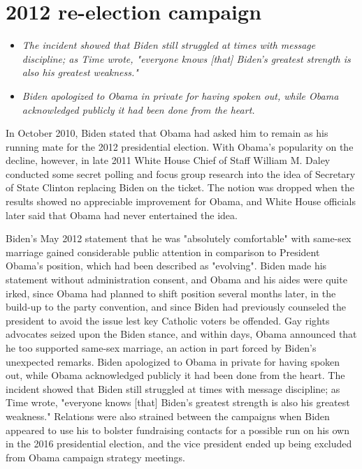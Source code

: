\section{2012 re-election campaign}\label{re-election-campaign}

\begin{itemize}
\item
  \emph{The incident showed that Biden still struggled at times with
  message discipline; as Time wrote, "everyone knows {[}that{]} Biden's
  greatest strength is also his greatest weakness."}
\item
  \emph{Biden apologized to Obama in private for having spoken out,
  while Obama acknowledged publicly it had been done from the heart.}
\end{itemize}

In October 2010, Biden stated that Obama had asked him to remain as his
running mate for the 2012 presidential election. With Obama's popularity
on the decline, however, in late 2011 White House Chief of Staff William
M. Daley conducted some secret polling and focus group research into the
idea of Secretary of State Clinton replacing Biden on the ticket. The
notion was dropped when the results showed no appreciable improvement
for Obama, and White House officials later said that Obama had never
entertained the idea.

Biden's May 2012 statement that he was "absolutely comfortable" with
same-sex marriage gained considerable public attention in comparison to
President Obama's position, which had been described as "evolving".
Biden made his statement without administration consent, and Obama and
his aides were quite irked, since Obama had planned to shift position
several months later, in the build-up to the party convention, and since
Biden had previously counseled the president to avoid the issue lest key
Catholic voters be offended. Gay rights advocates seized upon the Biden
stance, and within days, Obama announced that he too supported same-sex
marriage, an action in part forced by Biden's unexpected remarks. Biden
apologized to Obama in private for having spoken out, while Obama
acknowledged publicly it had been done from the heart. The incident
showed that Biden still struggled at times with message discipline; as
Time wrote, "everyone knows {[}that{]} Biden's greatest strength is also
his greatest weakness." Relations were also strained between the
campaigns when Biden appeared to use his to bolster fundraising contacts
for a possible run on his own in the 2016 presidential election, and the
vice president ended up being excluded from Obama campaign strategy
meetings.

